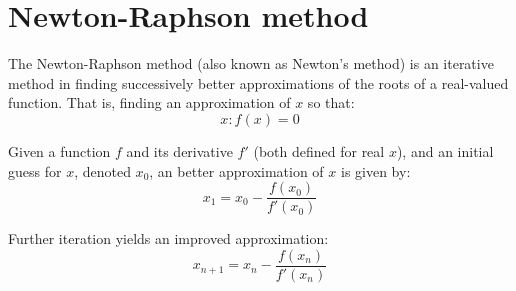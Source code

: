 \documentclass[internal,english]{sintefmemo2012}
\numberwithin{equation}{section}
\begin{document}
\section{Newton-Raphson method}
\label{app:NewtRaps}
The Newton-Raphson method (also known as Newton's method) is an iterative method in finding successively better approximations of the roots of a real-valued function. That is, finding an approximation of $x$ so that:
\begin{equation}
x : f(x) = 0
\end{equation}

Given a function $f$ and its derivative $f'$ (both defined for real $x$), and an initial guess for $x$, denoted $x_0$, an better approximation of $x$ is given by:
\begin{equation}
x_1 = x_0 - \frac{f(x_0)}{f'(x_0)}
\end{equation}

Further iteration yields an improved approximation:
\begin{equation}
x_{n+1} = x_{n} - \frac{f(x_{n})}{f'(x_{n})}
\end{equation}
\end{document}
